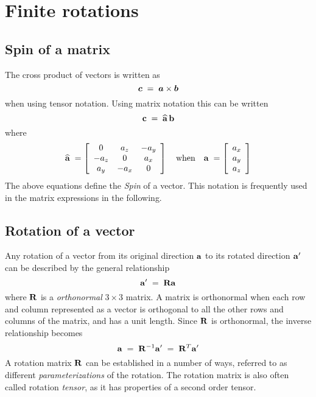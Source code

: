 \section{Finite rotations}
\label{s:Finite rotations}

\subsection{Spin of a matrix}

The cross product of vectors is written as
%
\begin{equation}
{\boldsymbol{c}} \;=\; {\boldsymbol{a}}\times{\boldsymbol{b}}
\end{equation}
%
when using tensor notation.
Using matrix notation this can be written
%
\begin{equation}
{\bf c} \;=\; \widehat{\bf a}\,{\bf b}
\end{equation}
%
where
%
\begin{equation}
\widehat{\bf a} \;=
\left[\begin{array}{ccc}
   0 &  a_z & -a_y \\
-a_z &    0 &  a_x \\
 a_y & -a_x &    0
\end{array}\right]
\quad\text{when}\quad
{\bf a} \;= \left[\begin{array}{c}
a_x \\ a_y \\ a_z
\end{array}\right]
\label{eqF:SpinDef}
\end{equation}
%
The above equations define the \textit{Spin} of a vector.
This notation is frequently used in the matrix expressions in the following.

\subsection{Rotation of a vector}

Any rotation of a vector from its original direction $\bf a$ to its rotated
direction ${\bf a}^\prime$ can be described by the general relationship
%
\begin{equation}
{\bf a}^\prime \;=\; {\bf R}{\bf a}
\end{equation}
%
where $\bf R$ is a {\em orthonormal} $3\times3$ matrix.
A matrix is orthonormal when each row and column represented as a vector is
orthogonal to all the other rows and columns of the matrix, and has a unit length.
Since $\bf R$ is orthonormal, the inverse relationship becomes
%
\begin{equation}
{\bf a} \;=\; {\bf R}^{-1}{\bf a}^\prime \;=\; {\bf R}^T{\bf a}^\prime
\end{equation}
%
A rotation matrix $\bf R$ can be established in a number of ways,
referred to as different {\em parameterizations} of the rotation.
The rotation matrix is also often called rotation {\em tensor},
as it has properties of a second order tensor.

